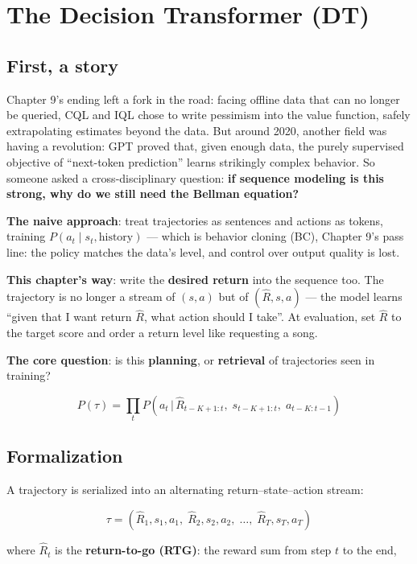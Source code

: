 \documentclass{article}
\begin{document}
\section*{The Decision Transformer (DT)}

\subsection*{First, a story}

Chapter 9's ending left a fork in the road: facing offline data that can no longer be queried, CQL and IQL chose to write pessimism into the value function, safely extrapolating estimates beyond the data. But around 2020, another field was having a revolution: GPT proved that, given enough data, the purely supervised objective of ``next-token prediction'' learns strikingly complex behavior. So someone asked a cross-disciplinary question: \textbf{if sequence modeling is this strong, why do we still need the Bellman equation?}

\textbf{The naive approach}: treat trajectories as sentences and actions as tokens, training $P(a_t \mid s_t, \text{history})$ --- which is behavior cloning (BC), Chapter 9's pass line: the policy matches the data's level, and control over output quality is lost.

\textbf{This chapter's way}: write the \textbf{desired return} into the sequence too. The trajectory is no longer a stream of $(s, a)$ but of $(\hat R, s, a)$ --- the model learns ``given that I want return $\hat R$, what action should I take''. At evaluation, set $\hat R$ to the target score and order a return level like requesting a song.

\textbf{The core question}: is this \textbf{planning}, or \textbf{retrieval} of trajectories seen in training?

\[
\boxed{P(\tau) = \prod_{t} P\!\left(a_t \,\Big|\, \hat{R}_{t-K+1:t},\; s_{t-K+1:t},\; a_{t-K:t-1}\right)}
\]

\subsection*{Formalization}

A trajectory is serialized into an alternating return--state--action stream:

\[
\tau = \left(\hat{R}_1, s_1, a_1,\; \hat{R}_2, s_2, a_2,\; \ldots,\; \hat{R}_T, s_T, a_T\right)
\]

where $\hat{R}_t$ is the \textbf{return-to-go (RTG)}: the reward sum from step $t$ to the end,
\end{document}
